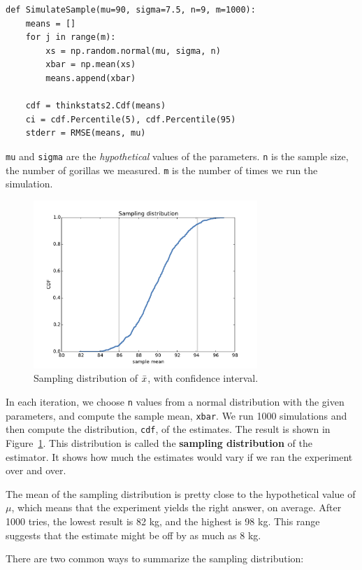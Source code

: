 \documentclass[12pt]{book}
\begin{document}
\begin{verbatim}
def SimulateSample(mu=90, sigma=7.5, n=9, m=1000):
    means = []
    for j in range(m):
        xs = np.random.normal(mu, sigma, n)
        xbar = np.mean(xs)
        means.append(xbar)

    cdf = thinkstats2.Cdf(means)
    ci = cdf.Percentile(5), cdf.Percentile(95)
    stderr = RMSE(means, mu)
\end{verbatim}

{\tt mu} and {\tt sigma} are the {\em hypothetical} values of
the parameters.  {\tt n} is the sample size, the number of
gorillas we measured.  {\tt m} is the number of times we run
the simulation.

\begin{figure}
\centerline{\includegraphics[height=2.5in]{figs/estimation1.pdf}}
\caption{Sampling distribution of $\bar{x}$, with confidence interval.}
\label{estimation1}
\end{figure}

In each iteration, we choose {\tt n} values from a normal
distribution with the given parameters, and compute the sample mean,
{\tt xbar}.  We run 1000 simulations and then compute the
distribution, {\tt cdf}, of the estimates.  The result is shown in
Figure~\ref{estimation1}.  This distribution is called the {\bf
  sampling distribution} of the estimator.  It shows how much the
estimates would vary if we ran the experiment over and over.

The mean of the sampling distribution is pretty close
to the hypothetical value of $\mu$, which means that the experiment
yields the right answer, on average.  After 1000 tries, the lowest
result is 82 kg, and the highest is 98 kg.  This range suggests that
the estimate might be off by as much as 8 kg.

There are two common ways to summarize the sampling distribution:
\end{document}
